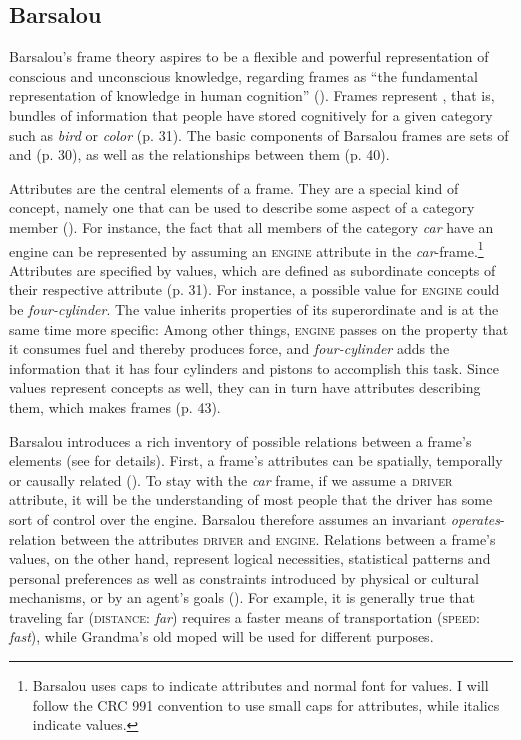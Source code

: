 \subsection{Barsalou}
\label{sec:fr-early-Barsalou}

Barsalou's frame theory aspires to be a flexible and powerful representation of conscious and unconscious knowledge, regarding frames as ``the fundamental representation of knowledge in human cognition'' (\citealt[21]{Barsalou.1992b}). Frames represent , that is, bundles of information that people have stored cognitively for a given category such as \textit{bird} or \textit{color} (p. 31). The basic components of Barsalou frames are sets of  and  (p. 30), as well as the relationships between them (p. 40).

Attributes are the central elements of a frame. They are a special kind of concept, namely one that can be used to describe some aspect of a category member (\citealt[30]{Barsalou.1992b}). For instance, the fact that all members of the category \textit{car} have an engine can be represented by assuming an \textsc{engine} attribute in the \textit{car}-frame.\footnote{Barsalou uses caps to indicate attributes and normal font for values. I will follow the CRC 991 convention to use small caps for attributes, while italics indicate values.} 
Attributes are specified by values, which are defined as subordinate concepts of their respective attribute (p. 31). For instance, a possible value for \textsc{engine} could be \textit{four-cylinder}. The value inherits properties of its superordinate and is at the same time more specific: Among other things, \textsc{engine} passes on the property that it consumes fuel and thereby produces force, and \textit{four-cylinder} adds the information that it has four cylinders and pistons to accomplish this task. Since values represent concepts as well, they can in turn have attributes describing them, which makes frames  (p. 43). 

Barsalou introduces a rich inventory of possible relations between a frame's elements (see \citealt[35--39]{Barsalou.1992b} for details). 
First, a frame's attributes can be spatially, temporally or causally related (\citealt[35]{Barsalou.1992b}). To stay with the \textit{car} frame, if we assume a \textsc{driver} attribute, it will be the understanding of most people that the driver has some sort of control over the engine. Barsalou therefore assumes an invariant \textit{operates}-relation between the attributes \textsc{driver} and \textsc{engine}. 
Relations between a frame's values, on the other hand, represent logical necessities, statistical patterns and personal preferences as well as constraints introduced by physical or cultural mechanisms, or by an agent's goals (\citealt[37--39]{Barsalou.1992b}). For example, it is generally true that traveling far (\textsc{distance:} \textit{far}) requires a faster means of transportation (\textsc{speed:} \textit{fast}), while Grandma's old moped will be used for different purposes.

